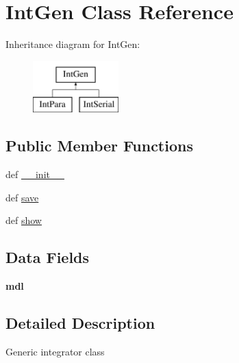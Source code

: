 \hypertarget{classcell__mdl_1_1_int_gen}{
\section{IntGen Class Reference}
\label{classcell__mdl_1_1_int_gen}
}
Inheritance diagram for IntGen:\begin{figure}[H]
\begin{center}
\leavevmode
\includegraphics[height=2cm]{classcell__mdl_1_1_int_gen}
\end{center}
\end{figure}
\subsection*{Public Member Functions}
\begin{DoxyCompactItemize}
\item 
def \hyperlink{classcell__mdl_1_1_int_gen_ac775ee34451fdfa742b318538164070e}{\_\-\_\-init\_\-\_\-}
\item 
def \hyperlink{classcell__mdl_1_1_int_gen_aba0970ece8740693d3b82e656500a9c0}{save}
\item 
def \hyperlink{classcell__mdl_1_1_int_gen_a051649d4f6e0c3c1e1e47d8699feb801}{show}
\end{DoxyCompactItemize}
\subsection*{Data Fields}
\begin{DoxyCompactItemize}
\item 
\hypertarget{classcell__mdl_1_1_int_gen_ad6686534e0ed181a7fd0878e86f3848a}{
{\bfseries mdl}}
\label{classcell__mdl_1_1_int_gen_ad6686534e0ed181a7fd0878e86f3848a}

\end{DoxyCompactItemize}


\subsection{Detailed Description}
\begin{DoxyVerb}Generic integrator class\end{DoxyVerb}
 

